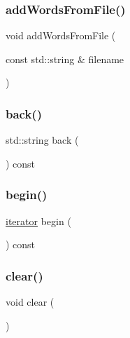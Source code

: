 \subsubsection{\texorpdfstring{add\+Words\+From\+File()}{addWordsFromFile()}\hspace{0.1cm}{\footnotesize\ttfamily [2/2]}}
{\footnotesize\ttfamily void add\+Words\+From\+File (\begin{DoxyParamCaption}\item[{const std\+::string \&}]{filename }\end{DoxyParamCaption})}

\mbox{\label{classLexicon_a324ff6b85a0d392036efefc95b5d5e83}} 
\subsubsection{\texorpdfstring{back()}{back()}}
{\footnotesize\ttfamily std\+::string back (\begin{DoxyParamCaption}{ }\end{DoxyParamCaption}) const}

\mbox{\label{classLexicon_a0c62c15c8ed609e7e5e9518cf5f5c712}} 
\subsubsection{\texorpdfstring{begin()}{begin()}}
{\footnotesize\ttfamily \mbox{\hyperlink{classLexicon_1_1iterator}{iterator}} begin (\begin{DoxyParamCaption}{ }\end{DoxyParamCaption}) const\hspace{0.3cm}{\ttfamily [inline]}}

\mbox{\label{classLexicon_ac8bb3912a3ce86b15842e79d0b421204}} 
\subsubsection{\texorpdfstring{clear()}{clear()}}
{\footnotesize\ttfamily void clear (\begin{DoxyParamCaption}{ }\end{DoxyParamCaption})}

